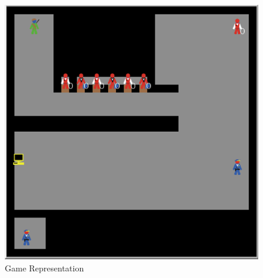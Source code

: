\documentclass[12pt]{article}
\begin{document}
\begin{figure}
\includegraphics[scale=.5]{Picture3.png}
\caption{Game Representation}
\end{figure}
\newpage
\end{document}
